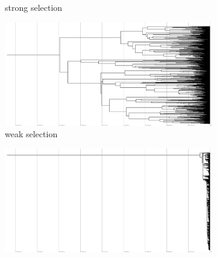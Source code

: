 \begin{figure}
\begin{subfigure}[b]{0.5\columnwidth}
    \caption{%
      strong selection}
  \end{subfigure}
  \hfill
  \begin{subfigure}[b]{0.5\columnwidth}
    \includegraphics[height=0.12\textheight,width=\textwidth]{img/perfect-tree-phylogenies-log/epoch=7+resolution=3+treatment=14.pdf}
    \caption{%
      weak selection}
  \end{subfigure}
  \hfill
  \begin{subfigure}[b]{0.5\columnwidth}
    \centering
    \includegraphics[height=0.12\textheight,width=\textwidth]{img/perfect-tree-phylogenies-log/epoch=7+resolution=3+treatment=8.pdf}

\end{subfigure}
\end{figure}
